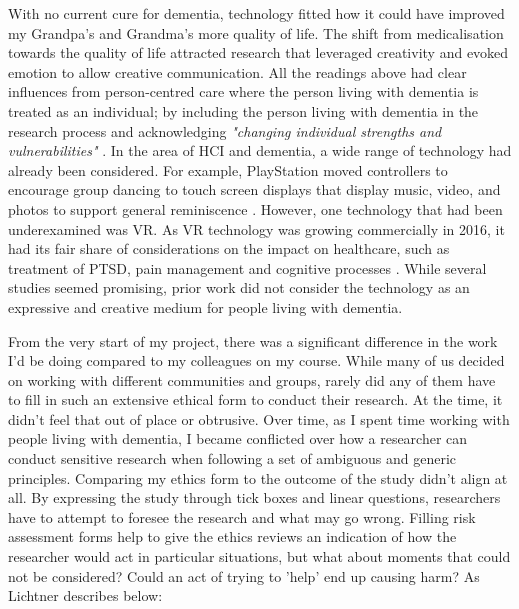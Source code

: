 With no current cure for dementia, technology fitted how it could have improved my Grandpa's and Grandma's more quality of life. The shift from medicalisation towards the quality of life attracted research that leveraged creativity \citep{john_killick_claire_craig_creativity_2012, lazar_critical_2017} and evoked emotion \citep{morrissey_creative_2015,wallace_design-led_2013} to allow creative communication. All the readings above had clear influences from person-centred care \citep{brooker_what_2003, kitwood_towards_1992} where the person living with dementia is treated as an individual; by including the person living with dementia in the research process and acknowledging \textit{"changing individual strengths and vulnerabilities"} \citep{suijkerbuijk_active_2019}. In the area of HCI and dementia, a wide range of technology had already been considered. For example, PlayStation moved controllers to encourage group dancing \citep{morrissey_im_2016} to touch screen displays that display music, video, and photos to support general reminiscence \citep{astell_stimulating_2010}. However, one technology that had been underexamined was VR. As VR technology was growing commercially in 2016, it had its fair share of considerations on the impact on healthcare, such as treatment of PTSD, pain management and cognitive processes \citep{hoffman_virtual_2000, schultheis_application_2001, slater_sense_2013}. While several studies seemed promising, prior work did not consider the technology as an expressive and creative medium for people living with dementia. 

From the very start of my project, there was a significant difference in the work I'd be doing compared to my colleagues on my course. While many of us decided on working with different communities and groups, rarely did any of them have to fill in such an extensive ethical form to conduct their research. At the time, it didn't feel that out of place or obtrusive. Over time, as I spent time working with people living with dementia, I became conflicted over how a researcher can conduct sensitive research when following a set of ambiguous and generic principles. Comparing my ethics form to the outcome of the study didn't align at all. By expressing the study through tick boxes and linear questions, researchers have to attempt to foresee the research and what may go wrong. Filling risk assessment forms help to give the ethics reviews an indication of how the researcher would act in particular situations, but what about moments that could not be considered? Could an act of trying to 'help' end up causing harm? As Lichtner describes below:

